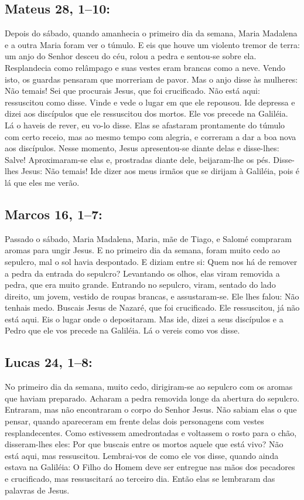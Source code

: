 \documentclass[10pt,a5paper]{book}
\newcommand{\from}[1]{\subsection*{#1}}
\begin{document}
\from{Mateus 28, 1--10:}

Depois do sábado, quando amanhecia o primeiro dia da semana, Maria Madalena e a outra Maria foram ver o túmulo.
E eis que houve um violento tremor de terra:
um anjo do Senhor desceu do céu, rolou a pedra e sentou-se sobre ela.
Resplandecia como relâmpago e suas vestes eram brancas como a neve.
Vendo isto, os guardas pensaram que morreriam de pavor.
Mas o anjo disse às mulheres:
Não temais! Sei que procurais Jesus, que foi crucificado.
Não está aqui:
ressuscitou como disse.
Vinde e vede o lugar em que ele repousou.
Ide depressa e dizei aos discípulos que ele ressuscitou dos mortos.
Ele vos precede na Galiléia.
Lá o haveis de rever, eu vo-lo disse.
Elas se afastaram prontamente do túmulo com certo receio, mas ao mesmo tempo com alegria, e correram a dar a boa nova aos discípulos.
Nesse momento, Jesus apresentou-se diante delas e disse-lhes:
Salve! Aproximaram-se elas e, prostradas diante dele, beijaram-lhe os pés.
Disse-lhes Jesus:
Não temais! Ide dizer aos meus irmãos que se dirijam à Galiléia, pois é lá que eles me verão.

\from{Marcos 16, 1--7:}

Passado o sábado, Maria Madalena, Maria, mãe de Tiago, e Salomé compraram aromas para ungir Jesus.
E no primeiro dia da semana, foram muito cedo ao sepulcro, mal o sol havia despontado.
E diziam entre si:
Quem nos há de remover a pedra da entrada do sepulcro?
Levantando os olhos, elas viram removida a pedra, que era muito grande.
Entrando no sepulcro, viram, sentado do lado direito, um jovem, vestido de roupas brancas, e assustaram-se.
Ele lhes falou:
Não tenhais medo.
Buscais Jesus de Nazaré, que foi crucificado.
Ele ressuscitou, já não está aqui.
Eis o lugar onde o depositaram.
Mas ide, dizei a seus discípulos e a Pedro que ele vos precede na Galiléia.
Lá o vereis como vos disse.

\from{Lucas 24, 1--8:}

No primeiro dia da semana, muito cedo, dirigiram-se ao sepulcro com os aromas que haviam preparado.
Acharam a pedra removida longe da abertura do sepulcro.
Entraram, mas não encontraram o corpo do Senhor Jesus.
Não sabiam elas o que pensar, quando apareceram em frente delas dois personagens com vestes resplandecentes.
Como estivessem amedrontadas e voltassem o rosto para o chão, disseram-lhes eles:
Por que buscais entre os mortos aquele que está vivo?
Não está aqui, mas ressuscitou.
Lembrai-vos de como ele vos disse, quando ainda estava na Galiléia:
O Filho do Homem deve ser entregue nas mãos dos pecadores e crucificado, mas ressuscitará ao terceiro dia.
Então elas se lembraram das palavras de Jesus.
\end{document}
